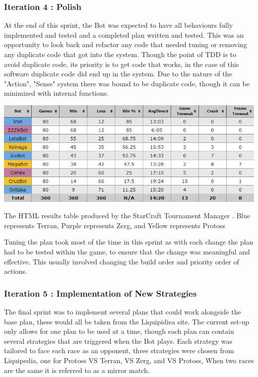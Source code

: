 \documentclass[journal]{IEEEtran}
\begin{document}
	\subsubsection{Iteration 4 : Polish}
	At the end of this sprint, the Bot was expected to have all behaviours fully implemented and tested and a completed plan written and tested. This was an opportunity to look back and refactor any code that needed tuning or removing any duplicate code that got into the system. Though the point of TDD is to avoid duplicate code, its priority is to get code that works, in the case of this software duplicate code did end up in the system. Due to the nature of the "Action", "Sense" system there was bound to be duplicate code, though it can be minimized with internal functions.
	\begin{table}[]
		\centering
		\includegraphics[width=\textwidth]{STMResults}
		\caption{The HTML results table produced by the StarCraft Tournament Manager \cite{Tournament}. Blue represents Terran, Purple represents Zerg, and Yellow represents Protoss}
		\label{Table1}
	\end{table}
	Tuning the plan took most of the time in this sprint as with each change the plan had to be tested within the game, to ensure that the change was meaningful and effective. This usually involved changing the build order and priority order of actions.
	\newline
	
	\subsubsection{Iteration 5 : Implementation of New Strategies}
	The final sprint was to implement several plans that could work alongside the base plan, these would all be taken from the Liquipidiea site. The current set-up only allows for one plan to be used at a time, though each plan can contain several strategies that are triggered when the Bot plays. Each strategy was tailored to face each race as an opponent, three strategies were chosen from Liquipedia, one for Protoss VS Terran, VS Zerg, and VS Protoss, When two races are the same it is referred to as a mirror match.
	
\end{document}
